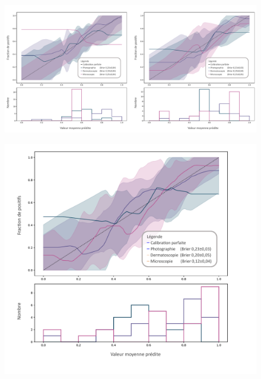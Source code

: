 \begin{figure}[H]
    \centering
    \includegraphics[width=\linewidth]{contents/chapter_8/resources/results_calibration_sequential_calibrated.pdf}
    \caption{}
    \label{fig:results_calibration_sequential_calibrated}
\end{figure}\par

\begin{figure}[H]
    \centering
    \includegraphics[width=\linewidth]{contents/chapter_8/resources/results_calibration_cumulative.pdf}
    \caption{}
    \label{fig:results_calibration_cumulative}
\end{figure}\par

